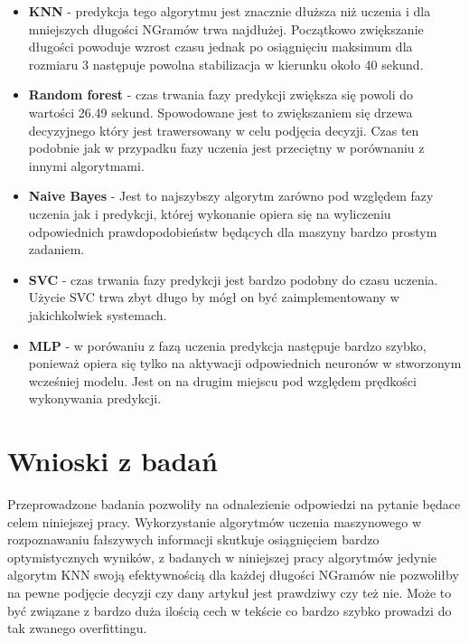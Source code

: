 \begin{itemize}
    \begin{itemize}
        \item \textbf{KNN} -
        predykcja tego algorytmu jest znacznie dłuższa niż uczenia i dla mniejszych długości NGramów trwa
        najdłużej. Początkowo zwiększanie długości powoduje wzrost czasu jednak po osiągnięciu maksimum dla rozmiaru 3
        następuje powolna stabilizacja w kierunku około 40 sekund.
        \item \textbf{Random forest} -
        czas trwania fazy predykcji zwiększa się powoli do wartości 26.49 sekund. Spowodowane jest to zwiększaniem
        się drzewa decyzyjnego który jest trawersowany w celu podjęcia decyzji. Czas ten podobnie jak w przypadku 
        fazy uczenia jest przeciętny w porównaniu z innymi algorytmami.
        \item \textbf{Naive Bayes} -
        Jest to najszybszy algorytm zarówno pod względem fazy uczenia jak i predykcji, której wykonanie 
        opiera się na wyliczeniu odpowiednich prawdopodobieństw będących dla maszyny bardzo prostym zadaniem. 
        \item \textbf{SVC} -
        czas trwania fazy predykcji jest bardzo podobny do czasu uczenia. Użycie SVC trwa zbyt długo
        by mógł on być zaimplementowany w jakichkolwiek systemach.
        \item \textbf{MLP} -
        w porówaniu z fazą uczenia predykcja następuje bardzo szybko, ponieważ opiera się tylko
        na aktywacji odpowiednich neuronów w stworzonym wcześniej modelu. Jest on na drugim miejscu
        pod względem prędkości wykonywania predykcji.
    \end{itemize}
\end{itemize}




\section{Wnioski z badań}
Przeprowadzone badania pozwoliły na odnalezienie odpowiedzi na pytanie 
będace celem niniejszej pracy. Wykorzystanie algorytmów uczenia maszynowego 
w rozpoznawaniu fałszywych informacji skutkuje osiągnięciem bardzo optymistycznych wyników,
z badanych w niniejszej pracy algorytmów jedynie algorytm KNN swoją efektywnością dla 
każdej długości NGramów nie pozwoliłby na pewne podjęcie decyzji czy dany artykuł jest prawdziwy czy też nie.
Może to być związane z bardzo duża ilością cech w tekście co bardzo szybko prowadzi do tak zwanego 
overfittingu. 

